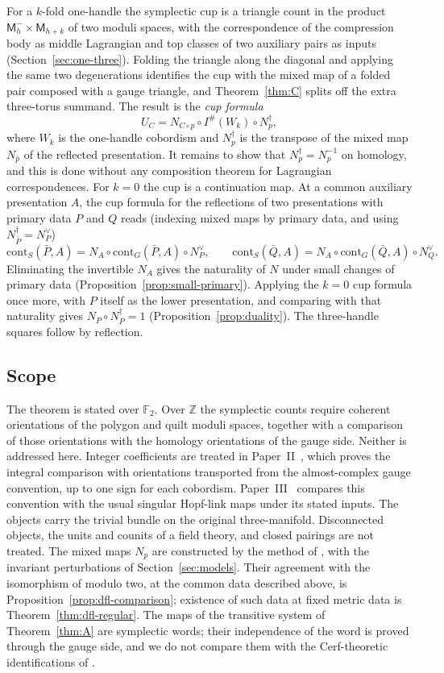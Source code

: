 \documentclass[11pt]{amsart}
\theoremstyle{definition}
\theoremstyle{remark}
\theoremstyle{plain}
\numberwithin{equation}{section}
\newcommand{\ZZ}{\mathbb{Z}}
\newcommand{\FF}{\mathbb{F}_2}
\newcommand{\Ish}{I^{\#}}
\newcommand{\Msf}{\mathsf{M}}
\begin{document}
For a $k$-fold one-handle the symplectic cup is a triangle count in the
product $\Msf_h^-\times\Msf_{h+k}$ of two moduli spaces, with the correspondence
of the compression body as middle Lagrangian and top classes of two
auxiliary pairs as inputs (Section~\ref{sec:one-three}). Folding the
triangle along the diagonal and applying the same two degenerations
identifies the cup with the mixed map of a folded pair composed with a gauge
triangle, and Theorem~\ref{thm:C} splits off the extra three-torus summand.
The result is the \emph{cup formula}
\[
U_C=N_{C\circ p}\circ\Ish(W_k)\circ N^\dagger_p ,
\]
where $W_k$ is the one-handle cobordism and $N^\dagger_p$ is the transpose of the mixed
map $N_{\bar p}$ of the reflected presentation. It remains to show that
$N^\dagger_p=N_p^{-1}$ on homology, and this is done without any composition theorem for
Lagrangian correspondences. For $k=0$ the cup is a continuation map. At a common auxiliary
presentation $A$, the cup formula for the reflections of two presentations with primary
data $P$ and $Q$ reads (indexing mixed maps by primary data, and using
$N^\dagger_{\bar P}=N_P^\vee$)
\[
\mathrm{cont}_S(\bar P,A)=N_A\circ\mathrm{cont}_G(\bar P,A)\circ N_P^\vee,\qquad
\mathrm{cont}_S(\bar Q,A)=N_A\circ\mathrm{cont}_G(\bar Q,A)\circ N_Q^\vee .
\]
Eliminating the invertible $N_A$ gives the naturality of $N$ under small changes of
primary data (Proposition~\ref{prop:small-primary}). Applying the $k=0$ cup
formula once more, with $P$ itself as the lower presentation, and comparing with
that naturality gives $N_P\circ N^\dagger_P=1$ (Proposition~\ref{prop:duality}). The
three-handle squares follow by reflection.

\subsection{Scope}

The theorem is stated over $\FF$. Over $\ZZ$ the symplectic counts
require coherent orientations of the polygon and quilt moduli spaces,
together with a comparison of those orientations with the homology
orientations of the gauge side. Neither is addressed here. Integer
coefficients are treated in Paper~II~\cite{Wuebben-II}, which proves the
integral comparison with orientations transported from the almost-complex
gauge convention, up to one sign for each cobordism. Paper~III~\cite{Wuebben-III}
compares this convention with the usual singular Hopf-link maps under its
stated inputs. The objects
carry the trivial bundle on the original three-manifold. Disconnected
objects, the units and counits of a field theory, and closed pairings are
not treated. The mixed maps $N_p$ are constructed by the method of
\cite{DFL}, with the invariant perturbations of Section~\ref{sec:models}.
Their agreement with the isomorphism of \cite{DFL} modulo two, at the common
data described above, is Proposition~\ref{prop:dfl-comparison}; existence of
such data at fixed metric data is Theorem~\ref{thm:dfl-regular}. The maps of the transitive system
of Theorem~\ref{thm:A} are symplectic words; their independence of the word is proved through
the gauge side, and we do not compare them with the Cerf-theoretic identifications
of \cite{WW-fft}.
\end{document}
